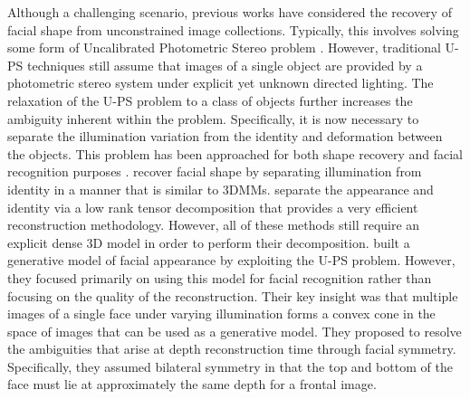 Although a challenging scenario, previous works have considered the recovery
of facial shape from unconstrained image collections.
Typically, this involves
solving some form of Uncalibrated Photometric Stereo problem
\cite{basri2007photometric,papadhimitri2014closed,papadhimitri2014closed,georghiades2001fromfew}.
However, traditional U-PS techniques still assume that images of a single object are
provided by a photometric stereo system under explicit yet unknown directed lighting.
The relaxation of the U-PS problem to a class of
objects further increases the ambiguity inherent within the problem.
Specifically, it is now necessary to separate the illumination variation
from the identity and deformation between the objects.
This problem has been approached for both shape recovery and
facial recognition purposes
\cite{lee2005bilinear,lee2005estimation,minsik2014realtime,minsik2013robust,zhou2007appearance}.
\citet{lee2005bilinear,lee2005estimation} recover facial shape by separating illumination
from identity in a manner that is similar to 3DMMs.
\citet{minsik2014realtime,minsik2013robust} separate the appearance and identity
via a low rank tensor decomposition that provides a very efficient
reconstruction methodology.
However, all of these methods still require an explicit dense 3D model in order
to perform their decomposition.
\citet{georghiades2001fromfew} built a generative model of facial appearance
by exploiting the U-PS problem. However, they focused primarily on using
this model for facial recognition rather than focusing on the quality of the
reconstruction. Their key insight was that multiple images of a single face
under varying illumination forms a convex cone in the space of images that can
be used as a generative model. They proposed to resolve the ambiguities that
arise at depth reconstruction time through facial symmetry. Specifically, they
assumed bilateral symmetry in that the top and bottom of the face must lie at
approximately the same depth for a frontal image.

